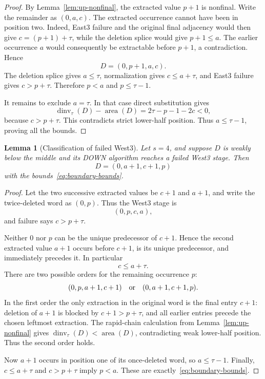 \documentclass[11pt]{article}
\newtheorem{lemma}[theorem]{Lemma}
\theoremstyle{definition}
\theoremstyle{remark}
\newcommand{\area}{\operatorname{area}}
\newcommand{\dinv}{\operatorname{dinv}}
\begin{document}
\begin{proof}
By Lemma~\ref{lem:up-nonfinal}, the extracted value $p+1$ is nonfinal.
Write the remainder as $(0,a,c)$.  The extracted occurrence cannot have
been in position two.  Indeed, East3 failure and the original final
adjacency would then give $c=(p+1)+\tau$, while the deletion splice would
give $p+1\le a$.  The earlier occurrence $a$ would consequently be
extractable before $p+1$, a contradiction.  Hence
\[
 D=(0,p+1,a,c).
\]
The deletion splice gives $a\le\tau$, normalization gives
$c\le a+\tau$, and East3 failure gives $c>p+\tau$.  Therefore $p<a$ and
$p\le\tau-1$.

It remains to exclude $a=\tau$.  In that case direct substitution gives
\[
 \dinv_\tau(D)-\area(D)=2\tau-p-1-2c<0,
\]
because $c>p+\tau$.  This contradicts strict lower-half position.  Thus
$a\le\tau-1$, proving all the bounds.
\end{proof}

\begin{lemma}[Classification of failed West3]
\label{lem:west-failure}
Let $s=4$, and suppose $D$ is weakly below the middle and its DOWN
algorithm reaches a failed West3 stage.  Then
\[
 D=(0,a+1,c+1,p)
\]
with the bounds~\eqref{eq:boundary-bounds}.
\end{lemma}

\begin{proof}
Let the two successive extracted values be $c+1$ and $a+1$, and write the
twice-deleted word as $(0,p)$.  Thus the West3 stage is
\[
 (0,p,c,a),
\]
and failure says $c>p+\tau$.

Neither $0$ nor $p$ can be the unique predecessor of $c+1$.  Hence the
second extracted value $a+1$ occurs before $c+1$, is its unique predecessor,
and immediately precedes it.  In particular
\[
 c\le a+\tau.
\]
There are two possible orders for the remaining occurrence $p$:
\[
 (0,p,a+1,c+1)
 \quad\hbox{or}\quad
 (0,a+1,c+1,p).
\]
In the first order the only extraction in the original word is the final
entry $c+1$: deletion of $a+1$ is blocked by
$c+1>p+\tau$, and all earlier entries precede the chosen leftmost
extraction.  The rapid-chain calculation from
Lemma~\ref{lem:up-nonfinal} gives
$\dinv_\tau(D)<\area(D)$, contradicting weak lower-half position.
Thus the second order holds.

Now $a+1$ occurs in position one of its once-deleted word, so
$a\le\tau-1$.  Finally, $c\le a+\tau$ and $c>p+\tau$ imply $p<a$.
These are exactly~\eqref{eq:boundary-bounds}.
\end{proof}
\end{document}
